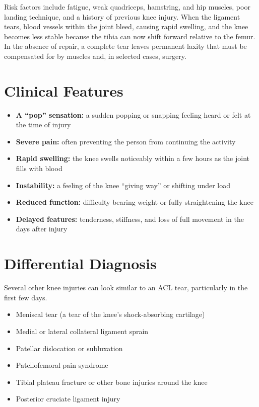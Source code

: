 Risk factors include fatigue, weak quadriceps, hamstring, and hip muscles, poor landing technique, and a history of previous knee injury. When the ligament tears, blood vessels within the joint bleed, causing rapid swelling, and the knee becomes less stable because the tibia can now shift forward relative to the femur. In the absence of repair, a complete tear leaves permanent laxity that must be compensated for by muscles and, in selected cases, surgery.

\section*{Clinical Features}
\begin{itemize}
    \item \textbf{A ``pop'' sensation:} a sudden popping or snapping feeling heard or felt at the time of injury
    \item \textbf{Severe pain:} often preventing the person from continuing the activity
    \item \textbf{Rapid swelling:} the knee swells noticeably within a few hours as the joint fills with blood
    \item \textbf{Instability:} a feeling of the knee ``giving way'' or shifting under load
    \item \textbf{Reduced function:} difficulty bearing weight or fully straightening the knee
    \item \textbf{Delayed features:} tenderness, stiffness, and loss of full movement in the days after injury
\end{itemize}

\section*{Differential Diagnosis}
Several other knee injuries can look similar to an ACL tear, particularly in the first few days.

\begin{itemize}
    \item Meniscal tear (a tear of the knee's shock-absorbing cartilage)
    \item Medial or lateral collateral ligament sprain
    \item Patellar dislocation or subluxation
    \item Patellofemoral pain syndrome
    \item Tibial plateau fracture or other bone injuries around the knee
    \item Posterior cruciate ligament injury
\end{itemize}

